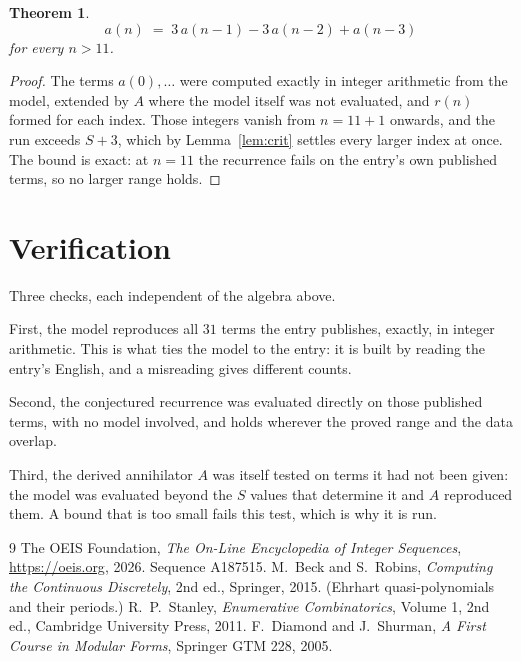 \documentclass[11pt,a4paper]{article}
\theoremstyle{plain}
\newtheorem{theorem}{Theorem}
\theoremstyle{definition}
\begin{document}
\begin{theorem}
\[
a(n)\;=\;3\,a(n-1) - 3\,a(n-2) + a(n-3)
\]
for every $n>11$.
\end{theorem}

\begin{proof}
The terms $a(0),\dots$ were computed exactly in integer arithmetic from the model, extended by
$A$ where the model itself was not evaluated, and $r(n)$ formed for each index. Those integers
vanish from $n=11+1$ onwards, and the run exceeds $S+3$, which by
Lemma~\ref{lem:crit} settles every larger index at once. The bound is exact: at $n=11$ the recurrence fails on the entry's own published terms, so no larger range holds.
\end{proof}

\section{Verification}

Three checks, each independent of the algebra above.

First, the model reproduces all $31$ terms the entry publishes, exactly, in integer
arithmetic. This is what ties the model to the entry: it is built by reading the entry's
English, and a misreading gives different counts.

Second, the conjectured recurrence was evaluated directly on those published terms, with no
model involved, and holds wherever the proved range and the data overlap.

Third, the derived annihilator $A$ was itself tested on terms it had not been given: the model
was evaluated beyond the $S$ values that determine it and $A$ reproduced them. A bound that is
too small fails this test, which is why it is run.

\begin{thebibliography}{9}
 The OEIS Foundation, \emph{The On-Line Encyclopedia of Integer
Sequences}, \url{https://oeis.org}, 2026. Sequence A187515.
 M.~Beck and S.~Robins, \emph{Computing the Continuous Discretely},
2nd ed., Springer, 2015. (Ehrhart quasi-polynomials and their periods.)
 R.~P.~Stanley, \emph{Enumerative Combinatorics}, Volume 1, 2nd ed.,
Cambridge University Press, 2011.
 F.~Diamond and J.~Shurman, \emph{A First Course in Modular Forms},
Springer GTM 228, 2005.
\end{thebibliography}
\end{document}
